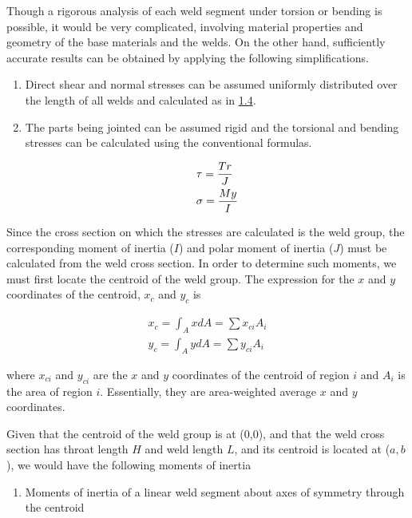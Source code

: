 \documentclass[a4paper,openany,12pt]{book}
\begin{document}
{{Though a rigorous analysis of each weld segment under torsion or bending
is possible, it would be very complicated, involving material properties
and geometry of the base materials and the welds. On the other hand,
sufficiently accurate results can be obtained by applying the following
simplifications.

\begin{enumerate}
\item Direct shear and normal stresses can be assumed uniformly distributed
over the length of all welds and calculated as in
\hyperref[sec:org5829f13]{1.4}.

\item The parts being jointed can be assumed rigid and the torsional and
bending stresses can be calculated using the conventional formulas.

$$\begin{gathered}
       \tau  = \frac{Tr}{J} \hfill \\
       \sigma  = \frac{My}{I} \hfill \\ 
     \end{gathered}$$
\end{enumerate}

Since the cross section on which the stresses are calculated is the weld
group, the corresponding moment of inertia (\(I\)) and polar moment of
inertia (\(J\)) must be calculated from the weld cross section. In order
to determine such moments, we must first locate the centroid of the weld
group. The expression for the \(x\) and \(y\) coordinates of the centroid,
\(x_c\) and \(y_c\) is

$$\begin{aligned}
  x_c = \int_A xdA = \sum x_{ci}A_i \\
  y_c = \int_A ydA = \sum y_{ci}A_i\end{aligned}$$

where \(x_{ci}\) and \(y_{ci}\) are the \(x\) and \(y\) coordinates of the
centroid of region \(i\) and \(A_i\) is the area of region \(i\). Essentially,
they are area-weighted average \(x\) and \(y\) coordinates.

Given that the centroid of the weld group is at (0,0), and that the weld
cross section has throat length \(H\) and weld length \(L\), and its
centroid is located at (\(a, b\)), we would have the following moments of
inertia



\begin{enumerate}
\item Moments of inertia of a linear weld segment about axes of symmetry
through the centroid


\end{enumerate}}}
\end{document}
